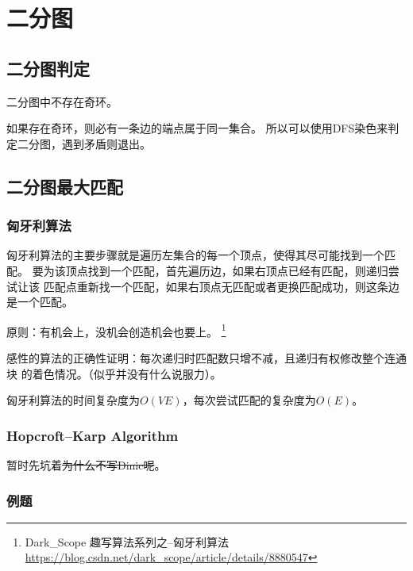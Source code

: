 \section{二分图}
\subsection{二分图判定}
\begin{property}
	二分图中不存在奇环。
\end{property}
如果存在奇环，则必有一条边的端点属于同一集合。
所以可以使用DFS染色来判定二分图，遇到矛盾则退出。



\subsection{二分图最大匹配}

\subsubsection{匈牙利算法}

匈牙利算法的主要步骤就是遍历左集合的每一个顶点，使得其尽可能找到一个匹配。
要为该顶点找到一个匹配，首先遍历边，如果右顶点已经有匹配，则递归尝试让该
匹配点重新找一个匹配，如果右顶点无匹配或者更换匹配成功，则这条边是一个匹配。

原则：有机会上，没机会创造机会也要上。
\footnote{Dark\_Scope 趣写算法系列之--匈牙利算法
	\url{https://blog.csdn.net/dark\_scope/article/details/8880547}}

感性的算法的正确性证明：每次递归时匹配数只增不减，且递归有权修改整个连通块
的着色情况。（似乎并没有什么说服力）。

匈牙利算法的时间复杂度为$O(VE)$，每次尝试匹配的复杂度为$O(E)$。


\subsubsection{Hopcroft–Karp Algorithm}
暂时先坑着\sout{为什么不写Dinic呢}。

\subsubsection{例题}

